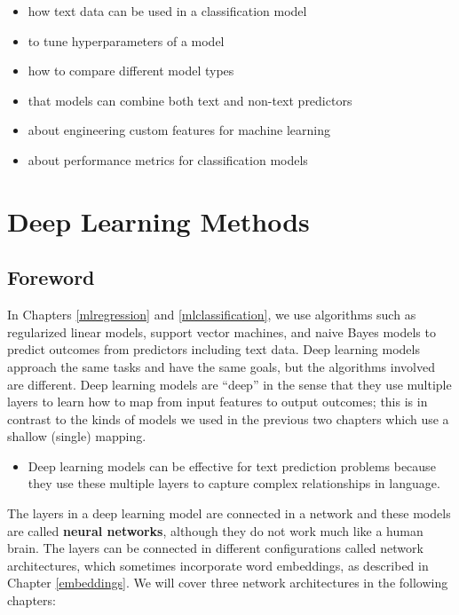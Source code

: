 \documentclass[
]{krantz}
\newenvironment{rmdblock}[1]
  {\begin{shaded*}
  \begin{itemize}[left = -1cm, labelsep = 1cm]
  \renewcommand{\labelitemi}{
    \raisebox{-.7\height}[0pt][0pt]{
      {\setkeys{Gin}{width=3em,keepaspectratio}\texttt{[image: images/\#1]}}
    }
  }
 
  \item
  }
  {
  \end{itemize}
  \end{shaded*}
  }
\newenvironment{rmdnote}
  {\begin{rmdblock}{note}}
  {\end{rmdblock}}
\begin{document}
\begin{itemize}
\item
  how text data can be used in a classification model
\item
  to tune hyperparameters of a model
\item
  how to compare different model types
\item
  that models can combine both text and non-text predictors
\item
  about engineering custom features for machine learning
\item
  about performance metrics for classification models
\end{itemize}

\hypertarget{part-deep-learning-methods}{%
\part{Deep Learning Methods}\label{part-deep-learning-methods}}

\hypertarget{dlforeword}{%
\chapter*{Foreword}\label{dlforeword}}


\thispagestyle{myheadings}

In Chapters \ref{mlregression} and \ref{mlclassification}, we use algorithms such as regularized linear models, support vector machines, and naive Bayes models to predict outcomes from predictors including text data. Deep learning models approach the same tasks and have the same goals, but the algorithms involved are different. Deep learning models are ``deep'' in the sense that they use multiple layers to learn how to map from input features to output outcomes; this is in contrast to the kinds of models we used in the previous two chapters which use a shallow (single) mapping.

\begin{rmdnote}
Deep learning models can be effective for text prediction problems
because they use these multiple layers to capture complex relationships
in language.
\end{rmdnote}

The layers in a deep learning model are connected in a network and these models are called \textbf{neural networks}, although they do not work much like a human brain. The layers can be connected in different configurations called network architectures, which sometimes incorporate word embeddings, as described in Chapter \ref{embeddings}. We will cover three network architectures in the following chapters:
\end{document}
